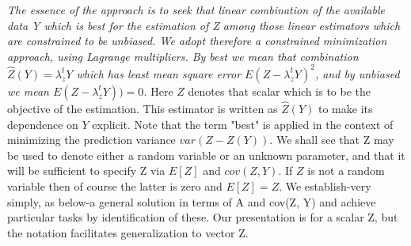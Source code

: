 \documentclass[12pt, a4paper]{article}
\begin{document}
\emph{
	The essence of the approach is to seek that linear combination of the available data Y which is best for the
	estimation of Z among those linear estimators which are constrained to be unbiased. We adopt therefore a constrained minimization approach, using Lagrange multipliers. By best we mean that combination $\hat{Z}(Y) = \lambda_{z}^{t}Y$ which has least mean square error $E( Z- \lambda_{z}^{t}Y)^2$, and by unbiased we mean $E( Z- \lambda_{z}^{t}Y)) = 0$. }
Here $Z$ denotes that scalar which is to be the objective of the estimation. This estimator is written as $\hat{Z}(Y)$ to make its dependence on $Y$ explicit. Note that the term "best" is applied in the context of minimizing the prediction variance $var(Z - Z(Y))$. We shall see that Z may be used to denote either a random variable or an unknown parameter, and that it will be sufficient to specify Z via $E[Z]$ and $cov(Z, Y)$. If $Z$ is not a random variable then of course the latter is zero and $E[Z] = Z$. We establish-very simply, as below-a general solution in terms of A and cov(Z, Y) and achieve particular tasks by identification of these. Our presentation is for a scalar Z, but the notation facilitates generalization to vector Z.


\end{document}
